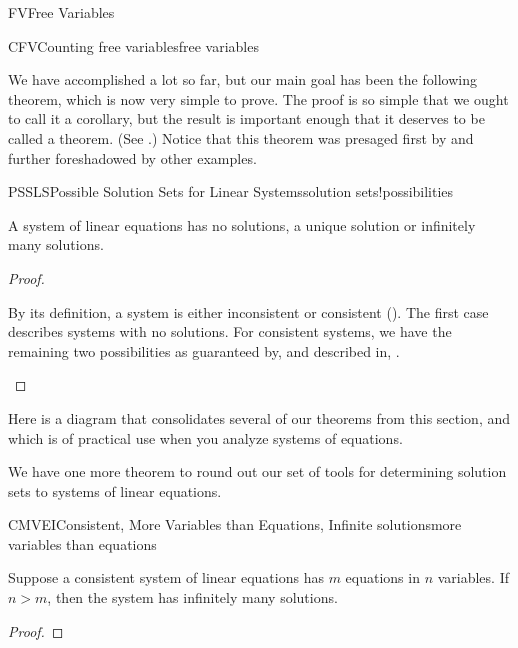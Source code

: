 \begin{subsect}{FV}{Free Variables}
\begin{example}{CFV}{Counting free variables}{free variables}
\begin{para}
\begin{enumerate}
%
\end{enumerate}
\end{para}
%
\end{example}
%
\begin{para}We have accomplished a lot so far, but our main goal has been the following theorem, which is now very simple to prove.  The proof is so simple that we ought to call it a corollary, but the result is important enough that it deserves to be called a theorem.    (See .)  Notice that this theorem was presaged first by  and further foreshadowed by other examples.\end{para}
%
\begin{theorem}{PSSLS}{Possible Solution Sets for Linear Systems}{solution sets!possibilities}
\begin{para}A system of linear equations has no solutions, a unique solution or infinitely many solutions.\end{para}
\end{theorem}
%
\begin{proof}
\begin{para}By its definition, a system is either inconsistent or consistent ().  The first case describes systems with no solutions.  For consistent systems, we have the remaining two possibilities as guaranteed by, and described in, .\end{para}
\end{proof}
%
\begin{para}Here is a diagram that consolidates several of our theorems from this section, and which is of practical use when you analyze systems of equations.
%
\end{para}
%
\begin{para}We have one more theorem to round out our set of tools for determining solution sets to systems of linear equations.\end{para}
%
\begin{theorem}{CMVEI}{Consistent, More Variables than Equations, Infinite solutions}{more variables than equations}
\begin{para}Suppose a consistent system of linear equations has $m$ equations in $n$ variables.  If $n>m$, then the system has infinitely many solutions.\end{para}
\end{theorem}
%
\begin{proof}

\end{proof}
\end{subsect}
